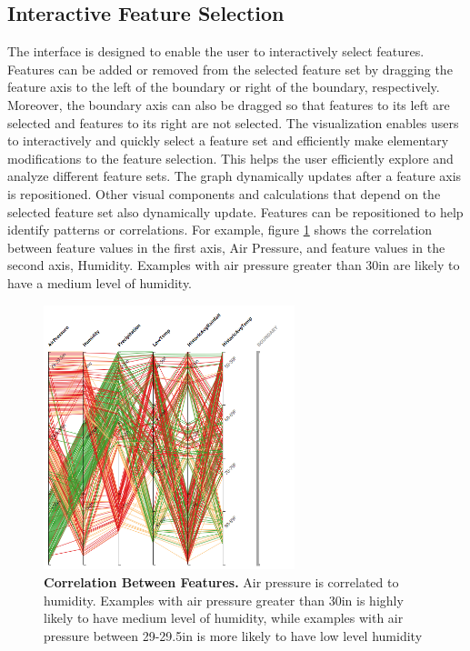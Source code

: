 \subsection{Interactive Feature Selection}
The interface is designed to enable the user to interactively select features. Features can be added or removed from the selected feature set by dragging the feature axis to the left of the boundary or right of the boundary, respectively. Moreover, the boundary axis can also be dragged so that features to its left are selected and features to its right are not selected. The visualization enables users to interactively and quickly select a feature set and efficiently make elementary modifications to the feature selection. This helps the user efficiently explore and analyze different feature sets. The graph dynamically updates after a feature axis is repositioned. Other visual components and calculations that depend on the selected feature set also dynamically update. Features can be repositioned to help identify patterns or correlations. For example, figure \ref{fig:FSCorrelation} shows the correlation between feature values in the first axis, Air Pressure, and feature values in the second axis, Humidity. Examples with air pressure greater than 30in are likely to have a medium level of humidity. 

\begin{figure}[!htbp]
\centering
\includegraphics[width=0.65\textwidth]{FSCorrelation}
\caption{\textbf{Correlation Between Features.} Air pressure is correlated to humidity. Examples with air pressure greater than 30in is highly likely to have medium level of humidity, while examples with air pressure between 29-29.5in is more likely to have low level humidity} \label{fig:FSCorrelation}
\end{figure}

